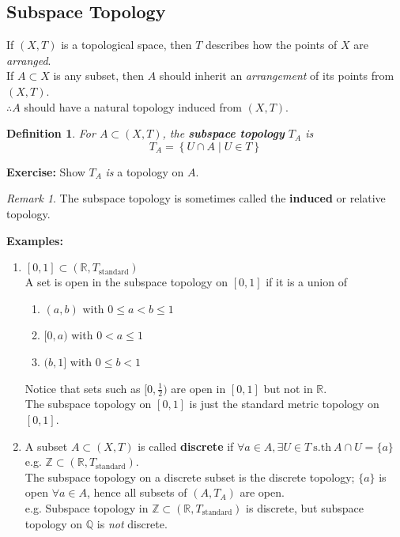 \documentclass{article}
\newcommand{\sth}{\mathrm{s.th}\ }
\newcommand{\R}{\mathbb{R}}
\newcommand{\Z}{\mathbb{Z}}
\newcommand{\Q}{\mathbb{Q}}
\newtheorem{sdefinition}[stheorem]{Definition}
\theoremstyle{remark}
\theoremstyle{example}
\theoremstyle{examples}
\newtheorem*{remark}{Remark}
\begin{document}
	\subsection{Subspace Topology}
	If $(X,T)$ is a topological space, then $T$ describes how the points of $X$ are \textit{arranged}.\\
	If $A \subset X$ is any subset, then $A$ should inherit an \textit{arrangement} of its points from $(X,T)$.\\
	$\therefore A$ should have a natural topology induced from $(X,T)$.
	
	\setcounter{theorem}{1}
	\begin{sdefinition}
		For $A \subset (X,T)$, the \textbf{subspace topology} $T_A$ is \[T_A  = \left\{ U \cap A \mid U \in T \right\} \]
	\end{sdefinition}

	\textbf{Exercise:} Show $T_A$ \textit{is} a topology on $A$.
	
	\begin{remark}
		The subspace topology is sometimes called the \textbf{induced} or relative topology.
	\end{remark}

	\textbf{Examples:} \begin{enumerate}
		\item $[0,1] \subset (\R,T_\mathrm{standard})$\\
		A set is open in the subspace topology on $[0,1]$ if it is a union of \begin{enumerate}
			\item $(a,b)$ with $0 \leq a < b \leq 1$
			\item $[0,a)$ with $0 < a \leq 1$
			\item $(b,1]$ with $0 \leq b < 1$
		\end{enumerate}
		Notice that sets such as $[0,\frac12)$ are open in $[0,1]$ but not in $\R$.\\
		The subspace topology on $[0,1]$ is just the standard metric topology on $[0,1]$.
		\item A subset $A \subset (X,T)$ is called \textbf{discrete} if $\forall a \in A, \exists U \in T \ \sth A \cap U = \{a\}$ e.g. $\Z \subset (\R,T_\mathrm{standard})$.\\
		The subspace topology on a discrete subset is the discrete topology; $\{a\}$ is open $\forall a \in A$, hence all subsets of $(A,T_A)$ are open.\\
		e.g. Subspace topology in $\Z \subset(\R,T_\mathrm{standard})$ is discrete, but subspace topology on $\Q$ is \textit{not} discrete.
	\end{enumerate}
\end{document}
